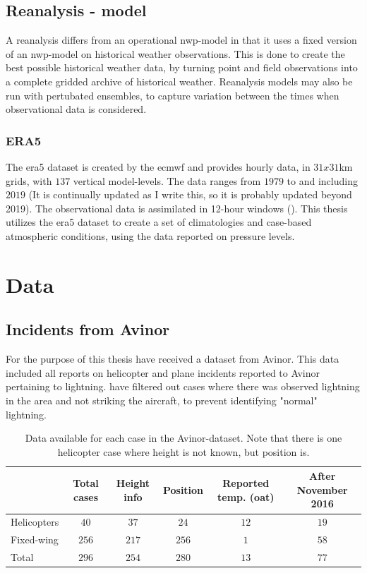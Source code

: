 \subsection{Reanalysis - model}\label{sec:ra}

A reanalysis differs from an operational \acrshort{nwp}-model in that it uses a fixed version of an \acrshort{nwp}-model on historical weather observations. This is done to create the best possible historical weather data, by turning point and field observations into a complete gridded archive of historical weather. Reanalysis models may also be run with pertubated ensembles, to capture variation between the times when observational data is considered.

\subsubsection{ERA5}\label{sec:era5}
The \acrfull{era5} dataset is created by the \acrfull{ecmwf} and provides hourly data, in $31x31$km grids, with $137$ vertical model-levels. The data ranges from $1979$ to and including $2019$ (It is continually updated as I write this, so it is probably updated beyond 2019). The observational data is assimilated in 12-hour windows (\cite{hersbach2018}).
This thesis utilizes the \acrshort{era5} dataset to create a set of climatologies and case-based atmospheric conditions, using the data reported on pressure levels.

\section{Data}\label{sec:data}

\subsection{Incidents from Avinor}\label{sec:avinordata}
For the purpose of this thesis have received a dataset from Avinor. This data included all reports on helicopter and plane incidents reported to Avinor pertaining to lightning. have filtered out cases where there was observed lightning in the area and not striking the aircraft, to prevent identifying "normal" lightning.

\begin{table}
    \begin{tabular}{ l|c|c|c|c|c} 
    		&Total cases & Height info & Position & Reported temp. (\acrshort{oat}) & After November 2016\\
     		\hline
     		Helicopters &$40$ & $37$ & $24$ & $12$&$19$\\
     		Fixed-wing &$256$ & $217$ & $256$ & $1$&$58$\\ 
     		\hline
     		Total &$296$ &$254$ & $280$ & $13$&$77$\\ 
     		\hline
    \end{tabular}
    \caption{Data available for each case in the Avinor-dataset. Note that there is one helicopter case where height is not known, but position is. }
    \label{tab:avinor}
\end{table}

